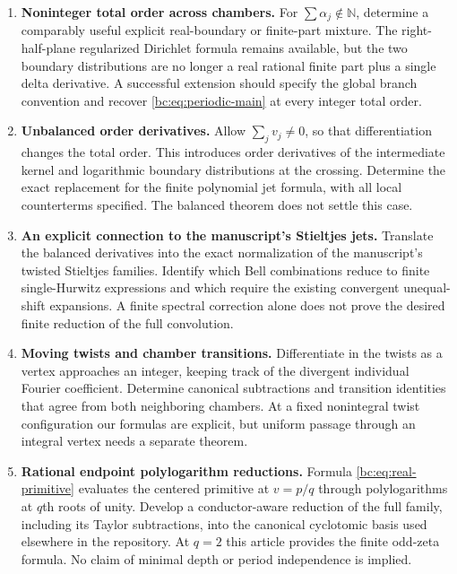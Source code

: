 \documentclass[11pt,letterpaper]{article}
\numberwithin{equation}{section}
\theoremstyle{definition}
\theoremstyle{remark}
\newcommand{\bcN}{\mathbb N}
\begin{document}
\begin{enumerate}
\item \textbf{Noninteger total order across chambers.}
For $\sum\alpha_j\notin\bcN$, determine a comparably useful explicit
real-boundary or finite-part mixture. The right-half-plane regularized
Dirichlet formula remains available, but the two boundary distributions
are no longer a real rational finite part plus a single delta derivative.
A successful extension should specify the global branch convention and
recover \eqref{bc:eq:periodic-main} at every integer total order.

\item \textbf{Unbalanced order derivatives.}
Allow $\sum_jv_j\ne0$, so that differentiation changes the total order.
This introduces order derivatives of the intermediate kernel and
logarithmic boundary distributions at the crossing. Determine the exact
replacement for the finite polynomial jet formula, with all local
counterterms specified. The balanced theorem does not settle this case.

\item \textbf{An explicit connection to the manuscript's Stieltjes jets.}
Translate the balanced derivatives into the exact normalization of the
manuscript's twisted Stieltjes families. Identify which Bell
combinations reduce to finite single-Hurwitz expressions and which
require the existing convergent unequal-shift expansions. A finite
spectral correction alone does not prove the desired finite reduction
of the full convolution.

\item \textbf{Moving twists and chamber transitions.}
Differentiate in the twists as a vertex approaches an integer, keeping
track of the divergent individual Fourier coefficient. Determine
canonical subtractions and transition identities that agree from both
neighboring chambers. At a fixed nonintegral twist configuration our
formulas are explicit, but uniform passage through an integral vertex
needs a separate theorem.

\item \textbf{Rational endpoint polylogarithm reductions.}
Formula \eqref{bc:eq:real-primitive} evaluates the centered primitive at
$v=p/q$ through polylogarithms at $q$th roots of unity. Develop a
conductor-aware reduction of the full family, including its Taylor
subtractions, into the canonical cyclotomic basis used elsewhere in the
repository. At $q=2$ this article provides the finite odd-zeta formula.
No claim of minimal depth or period independence is implied.


\end{enumerate}
\end{document}
